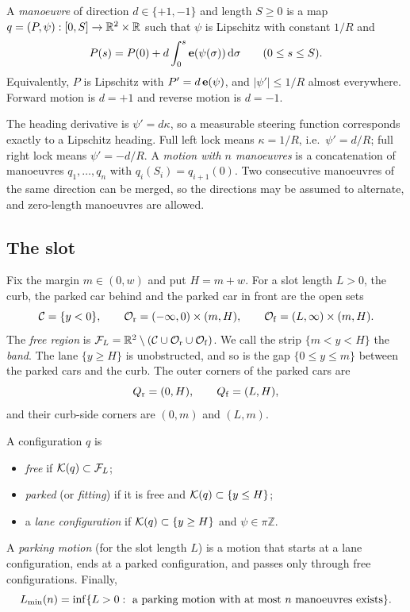 \begin{definition}[manoeuvre]\label{def:manoeuvre}
A \emph{manoeuvre} of direction $d\in\{+1,-1\}$ and length $S\ge0$ is a map $q=(P,\psi):[0,S]\to\mathbb{R}^2\times\mathbb{R}$ such that $\psi$ is Lipschitz with constant $1/R$ and
\[
  P(s)=P(0)+d\int_0^s\mathbf{e}(\psi(\sigma))\,\mathrm{d}\sigma\qquad(0\le s\le S).
\]
Equivalently, $P$ is Lipschitz with $P'=d\,\mathbf{e}(\psi)$, and $|\psi'|\le1/R$ almost everywhere.
Forward motion is $d=+1$ and reverse motion is $d=-1$.
\end{definition}

The heading derivative is $\psi'=d\kappa$, so a measurable steering function corresponds exactly to a Lipschitz heading.
Full left lock means $\kappa=1/R$, i.e.\ $\psi'=d/R$; full right lock means $\psi'=-d/R$.
A \emph{motion with $n$ manoeuvres} is a concatenation of manoeuvres $q_1,\dots,q_n$ with $q_i(S_i)=q_{i+1}(0)$.
Two consecutive manoeuvres of the same direction can be merged, so the directions may be assumed to alternate, and zero-length manoeuvres are allowed.

\subsection{The slot}
Fix the margin $m\in(0,w)$ and put $H=m+w$.
For a slot length $L>0$, the curb, the parked car behind and the parked car in front are the open sets
\[
  \mathcal C=\{y<0\},\qquad \mathcal{O}_{\mathrm r}=(-\infty,0)\times(m,H),\qquad \mathcal{O}_{\mathrm f}=(L,\infty)\times(m,H).
\]
The \emph{free region} is $\mathcal{F}_L=\mathbb{R}^2\setminus(\mathcal C\cup\mathcal{O}_{\mathrm r}\cup\mathcal{O}_{\mathrm f})$.
We call the strip $\{m<y<H\}$ the \emph{band}.
The lane $\{y\ge H\}$ is unobstructed, and so is the gap $\{0\le y\le m\}$ between the parked cars and the curb.
The outer corners of the parked cars are
\[
  Q_{\mathrm r}=(0,H),\qquad Q_{\mathrm f}=(L,H),
\]
and their curb-side corners are $(0,m)$ and $(L,m)$.

\begin{definition}\label{def:fit}
A configuration $q$ is
\begin{itemize}[nosep]
\item \emph{free} if $\mathcal{K}(q)\subset\mathcal{F}_L$;
\item \emph{parked} (or \emph{fitting}) if it is free and $\mathcal{K}(q)\subset\{y\le H\}$;
\item a \emph{lane configuration} if $\mathcal{K}(q)\subset\{y\ge H\}$ and $\psi\in\pi\mathbb Z$.
\end{itemize}
A \emph{parking motion} (for the slot length $L$) is a motion that starts at a lane configuration, ends at a parked configuration, and passes only through free configurations.
Finally,
\[
  L_{\min}(n)=\inf\{L>0:\ \text{a parking motion with at most $n$ manoeuvres exists}\}.
\]
\end{definition}

